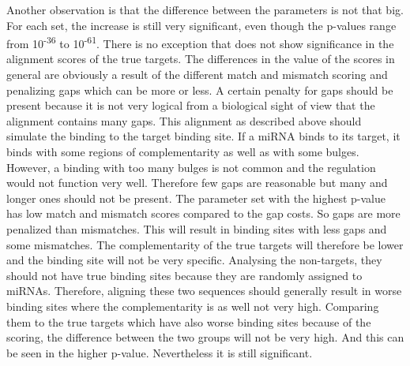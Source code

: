 \documentclass[11pt, a4paper, twoside]{book}
\begin{document}
Another observation is that the difference between the parameters is not that big. For each set, the increase is still very significant, even though the p-values range from 10\textsuperscript{-36} to 10\textsuperscript{-61}. There is no exception that does not show significance in the alignment scores of the true targets. The differences in the value of the scores in general are obviously a result of the different match and mismatch scoring and penalizing gaps which can be more or less. A certain penalty for gaps should be present because it is not very logical from a biological sight of view that the alignment contains many gaps. This alignment as described above should simulate the binding to the target binding site. If a miRNA binds to its target, it binds with some regions of complementarity as well as with some bulges. However, a binding with too many bulges is not common and the regulation would not function very well. Therefore few gaps are reasonable but many and longer ones should not be present.
The parameter set with the highest p-value has low match and mismatch scores compared to the gap costs. So gaps are more penalized than mismatches. This will result in binding sites with less gaps and some mismatches. The complementarity of the true targets will therefore be lower and the binding site will not be very specific. Analysing the non-targets, they should not have true binding sites because they are randomly assigned to miRNAs. Therefore, aligning these two sequences should generally result in worse binding sites where the complementarity is as well not very high. Comparing them to the true targets which have also worse binding sites because of the scoring, the difference between the two groups will not be very high. And this can be seen in the higher p-value. Nevertheless it is still significant. \\
\end{document}
